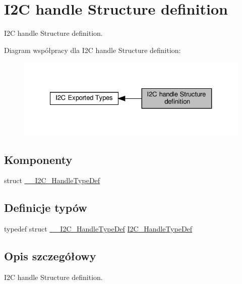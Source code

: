 \hypertarget{group___i2_c__handle___structure__definition}{}\section{I2C handle Structure definition}
\label{group___i2_c__handle___structure__definition}


I2C handle Structure definition.  


Diagram współpracy dla I2C handle Structure definition\+:\nopagebreak
\begin{figure}[H]
\begin{center}
\leavevmode
\includegraphics[width=327pt]{group___i2_c__handle___structure__definition}
\end{center}
\end{figure}
\subsection*{Komponenty}
\begin{DoxyCompactItemize}
\item 
struct \hyperlink{struct_____i2_c___handle_type_def}{\+\_\+\+\_\+\+I2\+C\+\_\+\+Handle\+Type\+Def}
\end{DoxyCompactItemize}
\subsection*{Definicje typów}
\begin{DoxyCompactItemize}
\item 
typedef struct \hyperlink{struct_____i2_c___handle_type_def}{\+\_\+\+\_\+\+I2\+C\+\_\+\+Handle\+Type\+Def} \hyperlink{group___i2_c__handle___structure__definition_ga68e9f45c2fd2161fb827ccdeabb55ea5}{I2\+C\+\_\+\+Handle\+Type\+Def}
\end{DoxyCompactItemize}


\subsection{Opis szczegółowy}
I2C handle Structure definition. 



